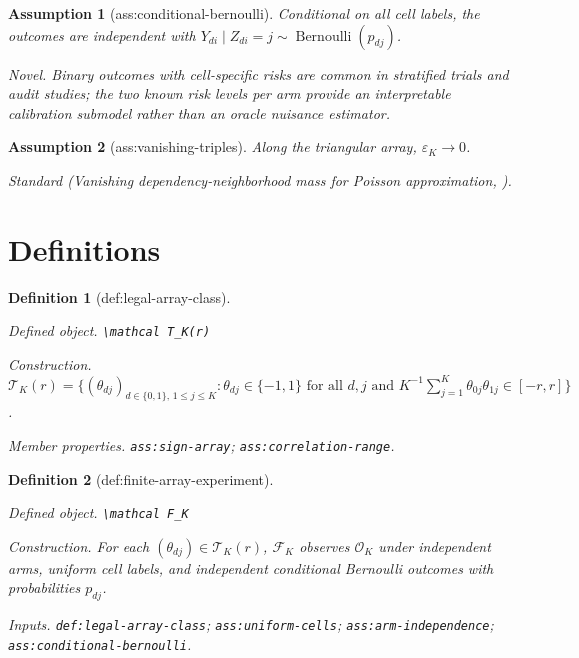 \documentclass{article}
\newtheorem{assumption}{Assumption}
\newtheorem{definition}{Definition}
\begin{document}
\begin{assumption}[ass:conditional-bernoulli]\label{ass:conditional-bernoulli}
Conditional on all cell labels, the outcomes are independent with \(Y_{di}\mid Z_{di}=j\sim\operatorname{Bernoulli}(p_{dj})\).
\par\smallskip\noindent\emph{Novel.} Binary outcomes with cell-specific risks are common in stratified trials and audit studies; the two known risk levels per arm provide an interpretable calibration submodel rather than an oracle nuisance estimator.
\end{assumption}

\begin{assumption}[ass:vanishing-triples]\label{ass:vanishing-triples}
Along the triangular array, \(\varepsilon_K\to0\).
\par\smallskip\noindent\emph{Standard} (Vanishing dependency-neighborhood mass for Poisson approximation, \cite{arratiaGoldsteinGordon1989}).
\end{assumption}

\section{Definitions}

\begin{definition}[def:legal-array-class]\label{def:legal-array-class}
\par\smallskip\noindent\emph{Defined object.} \texttt{\textbackslash{}\allowbreak{}mathcal T\_\allowbreak{}K(r)}
\par\smallskip\noindent\emph{Construction.} \(\mathcal T_K(r)=\{(\theta_{dj})_{d\in\{0,1\},\,1\le j\le K}: \theta_{dj}\in\{-1,1\}\text{ for all }d,j\text{ and }K^{-1}\sum_{j=1}^{K}\theta_{0j}\theta_{1j}\in[-r,r]\}\).
\par\smallskip\noindent\emph{Member properties.} \texttt{ass:\allowbreak{}sign-\allowbreak{}array}; \texttt{ass:\allowbreak{}correlation-\allowbreak{}range}.
\end{definition}

\begin{definition}[def:finite-array-experiment]\label{def:finite-array-experiment}
\par\smallskip\noindent\emph{Defined object.} \texttt{\textbackslash{}\allowbreak{}mathcal F\_\allowbreak{}K}
\par\smallskip\noindent\emph{Construction.} For each \((\theta_{dj})\in\mathcal T_K(r)\), \(\mathcal F_K\) observes \(\mathcal O_K\) under independent arms, uniform cell labels, and independent conditional Bernoulli outcomes with probabilities \(p_{dj}\).
\par\smallskip\noindent\emph{Inputs.} \texttt{def:\allowbreak{}legal-\allowbreak{}array-\allowbreak{}class}; \texttt{ass:\allowbreak{}uniform-\allowbreak{}cells}; \texttt{ass:\allowbreak{}arm-\allowbreak{}independence}; \texttt{ass:\allowbreak{}conditional-\allowbreak{}bernoulli}.
\end{definition}
\end{document}

